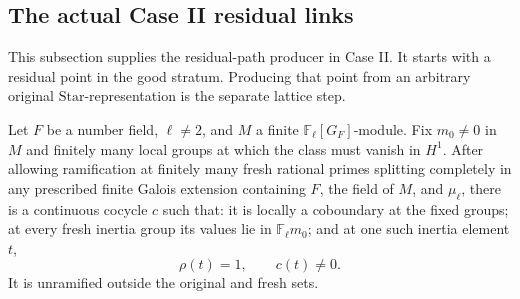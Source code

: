 \subsection{The actual Case II residual links}
\label{subsec:sr-four-case-II-residual-links}

This subsection supplies the residual-path producer in Case II.
It starts with a residual point in the good stratum.
Producing that point from an arbitrary original
\(\mathrm{Star}\)-representation is the separate lattice step.

\begin{srlemma}
\label{lem:sr-four-ramified-line-class}
Let \(F\) be a number field, \(\ell\ne2\), and \(M\) a finite
\(\mathbb F_\ell[G_F]\)-module. Fix \(m_0\ne0\) in \(M\)
and finitely many local groups at which the class must vanish
in \(H^1\). After allowing ramification at finitely many fresh
rational primes splitting completely in any prescribed finite
Galois extension containing \(F\), the field of \(M\), and
\(\mu_\ell\), there is a continuous cocycle \(c\) such that:
it is locally a coboundary at the fixed groups;
at every fresh inertia group its values lie in
\(\mathbb F_\ell m_0\); and at one such inertia element \(t\),
\[
                    \rho(t)=1,\qquad c(t)\ne0.             \tag{R4L1}
\]
It is unramified outside the original and fresh sets.
\end{srlemma}
